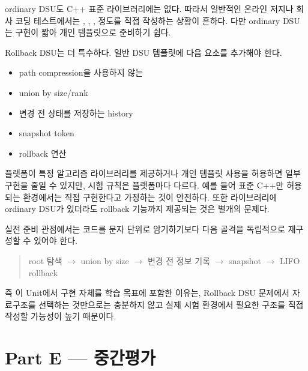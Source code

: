 ordinary DSU도 C++ 표준 라이브러리에는 없다. 따라서 일반적인 온라인 저지나 회사 코딩 테스트에서는 , , ,  정도를 직접 작성하는 상황이 흔하다. 다만 ordinary DSU는 구현이 짧아 개인 템플릿으로 준비하기 쉽다.

Rollback DSU는 더 특수하다. 일반 DSU 템플릿에 다음 요소를 추가해야 한다.
\begin{itemize}
\item path compression을 사용하지 않는 
\item union by size/rank
\item 변경 전 상태를 저장하는 history
\item snapshot token
\item rollback 연산
\end{itemize}

플랫폼이 특정 알고리즘 라이브러리를 제공하거나 개인 템플릿 사용을 허용하면 일부 구현을 줄일 수 있지만, 시험 규칙은 플랫폼마다 다르다. 예를 들어 표준 C++만 허용되는 환경에서는 직접 구현한다고 가정하는 것이 안전하다. 또한 라이브러리에 ordinary DSU가 있더라도 rollback 기능까지 제공되는 것은 별개의 문제다.

실전 준비 관점에서는 코드를 문자 단위로 암기하기보다 다음 골격을 독립적으로 재구성할 수 있어야 한다.
\begin{quote}
root 탐색 $\rightarrow$ union by size $\rightarrow$ 변경 전 정보 기록 $\rightarrow$ snapshot $\rightarrow$ LIFO rollback
\end{quote}

즉 이 Unit에서 구현 자체를 학습 목표에 포함한 이유는, Rollback DSU 문제에서 자료구조를 선택하는 것만으로는 충분하지 않고 실제 시험 환경에서 필요한 구조를 직접 작성할 가능성이 높기 때문이다.


\section{Part E --- 중간평가}

